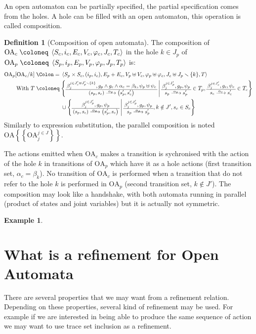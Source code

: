 \documentclass{article}
\theoremstyle{plain}
\theoremstyle{definition}
\newtheorem{defi}{Definition}
\newtheorem{exi}{Example}
\newcommand\mpar[1]{{\left(#1\right)}}
\newcommand\mbrk[1]{{\left[#1\right]}}
\newcommand\mbrc[1]{{\left\{#1\right\}}}
\newcommand\psubst[1]{\mbrc{\!\!\mbrc{#1}\!\!}}
\newcommand\subst[2]{\mbrk{#1\middle/#2}}
\newcommand\midbar{\,\middle|\,}
\newcommand\mset[2]{\mbrc{#1\midbar #2}}
\newcommand\defnotation{\DOTSB\;{\Colon=}\;}
\newcommand\defobject{\DOTSB\;{\coloneq}\;}
\newcommand\OA[7]{\left<#1,#2,#3,#4, #5,#6,#7\right>}
\newcommand\OT[6]{\text{\small\(%
	\setlength\arraycolsep{2pt}\everymath{\displaystyle}%
	\begin{array}{c}%
	#4,#5,#6 \\\hline
	#1\xrightarrow{\raisebox{-1.5pt}[.8\height][0pt]{\makebox[1.4\width]{\(\scriptstyle #3\)}}}#2
	\end{array}\)}}
\newcommand\OTx[4]{\OT{s_{#1}}{s'_{#1 #2}}{\alpha_{#1 #2}}{\beta_{#3 j}^{j \in J'_{#4}}}{g_{#1 #2}}{\psi_{#1 #2}}}
\begin{document}
An open automaton can be partially specified, the partial specification comes from the holes.
A hole can be filled with an open automaton, this operation is called composition.
\begin{defi}[Composition of open automata]
The composition of \(\mathrm{OA}_c \defobject \OA{S_c}{i_c}{E_c}{V_c}{\varphi_c}{J_c}{T_c}\) in the hole \(k \in J_p\) of \(\mathrm{OA}_p \defobject \OA{S_p}{i_p}{E_p}{V_p}{\varphi_p}{J_p}{T_p}\) is:
\begin{align*}
	\mathrm{OA}_p\subst{\mathrm{OA}_c}{k} \defnotation & \OA{S_p \times S_c}{\mpar{i_p, i_c}}{E_p + E_c}{V_p \uplus V_c}{\varphi_p \uplus \varphi_c}{J_c \uplus J_p \setminus \mbrc{k}}{T} \\
	\text{With } T \defobject & \mset{\OT{\mpar{s_p, s_c}}{\mpar{s'_p, s'_c}}{\alpha_p}{\beta_j^{j \in J'_c \uplus J'_p \setminus \mbrc{k}}}{g_p \wedge g_c \wedge \alpha_c = \beta_k}{\psi_p \uplus \psi_c}}{\OTx{p}{}{}{p} \in T_p, \OTx{c}{}{}{c} \in T_c} \\
	& \cup \mset{\OT{\mpar{s_p, s_c}}{\mpar{s'_p, s_c}}{\alpha_p}{\beta_j^{j \in J'_p}}{g_p}{\psi_p}}{\OTx{p}{}{}{p}, k \notin J', s_c \in S_c}
\end{align*}
Similarly to expression substitution, the parallel composition is noted \(\mathrm{OA}\psubst{\mathrm{OA}_j^{j \in J}}\).
\end{defi}
The actions emitted when \(\mathrm{OA}_c\) makes a transition is sychronised with the action of the hole \(k\) in transitions of \(\mathrm{OA}_p\) which have it as a hole actions (first transition set, \(\alpha_c = \beta_k\)).
No transition of \(\mathrm{OA}_c\) is performed when a transition that do not refer to the hole \(k\) is performed in \(\mathrm{OA}_p\) (second transition set, \(k \notin J'\)).
The composition may look like a handshake, with both automata running in parallel (product of states and joint variables) but it is actually not symmetric.
\begin{exi} %
\end{exi}


\section{What is a refinement for Open Automata} %
There are several properties that we may want from a refinement relation.
Depending on these properties, several kind of refinement may be used.
For example if we are interested in being able to produce the same sequence of action we may want to use trace set inclusion as a refinement.
\end{document}
